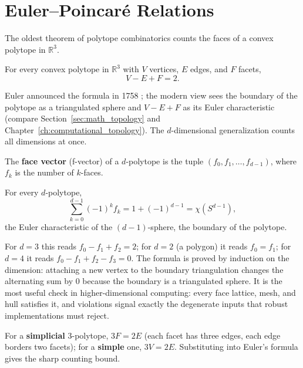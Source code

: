 
\section{Euler--Poincar\'e Relations}
\label{sec:polytopes_euler_poincare}

The oldest theorem of polytope combinatorics counts the faces of a convex
polytope in $\mathbb{R}^3$.

\begin{theorem}\label{thm:polytopes_euler}
  For every convex polytope in $\mathbb{R}^3$ with $V$ vertices, $E$ edges,
  and $F$ facets,
  \[
    V - E + F = 2 .
  \]
\end{theorem}

Euler announced the formula in 1758 \cite{euler1758}; the modern view
\cite{poincare1895} sees the boundary of the polytope as a triangulated
sphere and $V - E + F$ as its Euler characteristic (compare
Section~\ref{sec:math_topology} and Chapter~\ref{ch:computational_topology}).
The $d$-dimensional generalization counts all dimensions at once.

\begin{definition}\label{def:polytopes_f_vector}
  The \textbf{face vector} (f-vector) of a $d$-polytope is the tuple
  $(f_0, f_1, \dots, f_{d-1})$, where $f_k$ is the number of $k$-faces.
\end{definition}

\begin{theorem}\label{thm:polytopes_euler_poincare}
  For every $d$-polytope,
  \[
    \sum_{k=0}^{d-1} (-1)^k f_k
      = 1 + (-1)^{d-1}
      = \chi(S^{d-1}),
  \]
  the Euler characteristic of the $(d-1)$-sphere, the boundary of the
  polytope.
\end{theorem}

For $d = 3$ this reads $f_0 - f_1 + f_2 = 2$; for $d = 2$ (a polygon) it
reads $f_0 = f_1$; for $d = 4$ it reads $f_0 - f_1 + f_2 - f_3 = 0$. The
formula is proved by induction on the dimension: attaching a new vertex to
the boundary triangulation changes the alternating sum by $0$ because the
boundary is a triangulated sphere. It is the most useful check in
higher-dimensional computing: every face lattice, mesh, and hull satisfies
it, and violations signal exactly the degenerate inputs that robust
implementations must reject.

For a \textbf{simplicial} $3$-polytope, $3F = 2E$ (each facet has three
edges, each edge borders two facets); for a \textbf{simple} one, $3V = 2E$.
Substituting into Euler's formula gives the sharp counting bound.

